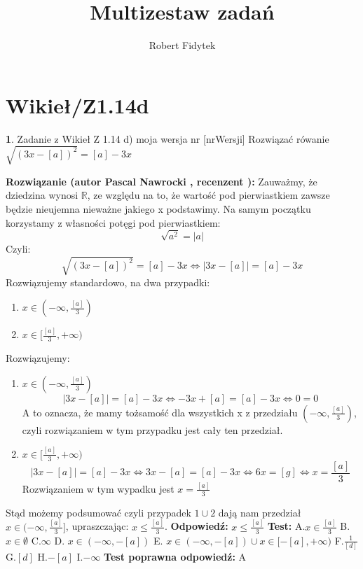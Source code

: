 \documentclass[12pt, a4paper]{article}
\title{Multizestaw zadań}
\author{Robert Fidytek}
\date{}
\theoremstyle{definition} %
\newtheorem{zad}{}
\newcommand{\kategoria}[1]{\section{#1}} %
\newcommand{\zadStart}[1]{\begin{zad}#1\newline} %
\newcommand{\zadStop}{\end{zad}}   %
\newcommand{\rozwStart}[2]{\noindent \textbf{Rozwiązanie (autor #1 , recenzent #2): }\newline} %
\newcommand{\odpStart}{\noindent \textbf{Odpowiedź:}\newline}    %
\newcommand{\odpStop}{\newline}                                             %
\newcommand{\testStart}{\noindent \textbf{Test:}\newline} %
\newcommand{\testStop}{\newline} %
\newcommand{\kluczStart}{\noindent \textbf{Test poprawna odpowiedź:}\newline} %
\newcommand{\kluczStop}{\newline} %
\begin{document}
\maketitle



\kategoria{Wikieł/Z1.14d}
\zadStart{Zadanie z Wikieł Z 1.14 d) moja wersja nr [nrWersji]}
Rozwiązać rówanie $\sqrt{{(3x-[a])}^2}=[a]-3x$
\zadStop
\rozwStart{Pascal Nawrocki}{}
Zauważmy, że dziedzina wynosi $\mathbb{R}$, ze względu na to, że wartość pod pierwiastkiem zawsze będzie nieujemna nieważne jakiego x podstawimy.
Na samym początku korzystamy z własności potęgi pod pierwiastkiem: $$\sqrt{a^2}=|a|$$
Czyli:
$$\sqrt{{(3x-[a])}^2}=[a]-3x \Leftrightarrow |3x-[a]|=[a]-3x $$
Rozwiązujemy standardowo, na dwa przypadki:
\begin{enumerate}
\item$x\in(-\infty,\frac{[a]}{3})$
\item$x\in[\frac{[a]}{3},+\infty)$
\end{enumerate}
Rozwiązujemy:
\begin{enumerate}
\item$x\in(-\infty,\frac{[a]}{3})$
$$|3x-[a]|=[a]-3x\Leftrightarrow-3x+[a]=[a]-3x\Leftrightarrow 0=0$$
A to oznacza, że mamy tożsamość dla wszystkich x z przedziału $(-\infty,\frac{[a]}{3})$, czyli rozwiązaniem w tym przypadku jest cały ten przedział.
\item$x\in[\frac{[a]}{3},+\infty)$
$$|3x-[a]|=[a]-3x\Leftrightarrow3x-[a]=[a]-3x\Leftrightarrow6x=[g]\Leftrightarrow x=\frac{[a]}{3}$$
Rozwiązaniem w tym wypadku jest $x=\frac{[a]}{3}$
\end{enumerate}
Stąd możemy podsumować czyli przypadek $1\cup2$ dają nam przedział $x\in(-\infty,\frac{[a]}{3}]$, upraszczając: $x\leq\frac{[a]}{3}$.
\odpStart
$x\leq\frac{[a]}{3}$
\odpStop
\testStart
A.$x\in\frac{[a]}{3}$
B.$x\in \emptyset$
C.$\infty$
D. $x\in (-\infty,-[a])$
E. $x\in (-\infty,-[a])\cup x\in[-[a],+\infty)$
F.$\frac{1}{[d]}$
G.$[d]$
H.$-[a]$
I.$-\infty$
\testStop
\kluczStart
A
\kluczStop
\end{document}
